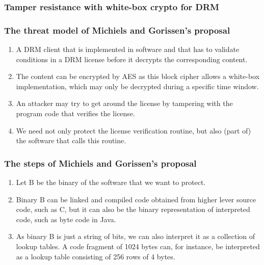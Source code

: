 \documentclass[aspectratio=169,xcolor=dvipsnames]{beamer}
\begin{document}
\frame
{
\frametitle{Tamper resistance with white-box crypto for DRM}

\begin{center}
\end{center}

}

\frame
{
\frametitle{The threat model of Michiels and Gorissen's proposal}
\begin{enumerate}
\setlength{\itemsep}{12pt}
\item A DRM client that is implemented in software and that has to validate conditions in a DRM license before it decrypts the corresponding content. \item The content can be encrypted by AES as this block cipher allows a white-box implementation, which may only be decrypted during a specific time window.
\item An attacker may try to get around the license by tampering with the program code that verifies the license.
\item We need not only protect the license verification routine, but also (part of) the software that calls this routine.
\end{enumerate}
}

\frame
{
\frametitle{The steps of Michiels and Gorissen's proposal}
\begin{enumerate}
\setlength{\itemsep}{12pt}
\item Let B be the binary of the software that we want to protect.
\item Binary B can be linked and compiled code obtained from higher lever source code, such as C, but it can also be the binary representation of interpreted code, such as byte code in Java.
\item As binary B is just a string of bits, we can also interpret it as a collection of lookup tables. A code fragment of 1024 bytes can, for instance, be interpreted as a lookup table consisting of 256 rows of 4 bytes.
\end{enumerate}
}
\end{document}
